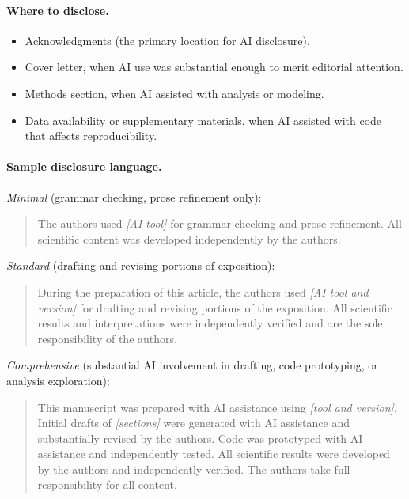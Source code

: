\documentclass{SIAMbook2023}
\begin{document}
\paragraph{Where to disclose.}
\begin{itemize}
\item Acknowledgments (the primary location for AI disclosure).
\item Cover letter, when AI use was substantial enough to merit editorial attention.
\item Methods section, when AI assisted with analysis or modeling.
\item Data availability or supplementary materials, when AI assisted with code that affects reproducibility.
\end{itemize}

\paragraph{Sample disclosure language.}

\textit{Minimal} (grammar checking, prose refinement only):

\begin{quote}
The authors used \textit{[AI tool]} for grammar checking and prose refinement. All scientific content was developed independently by the authors.
\end{quote}

\textit{Standard} (drafting and revising portions of exposition):

\begin{quote}
During the preparation of this article, the authors used \textit{[AI tool and version]} for drafting and revising portions of the exposition. All scientific results and interpretations were independently verified and are the sole responsibility of the authors.
\end{quote}

\textit{Comprehensive} (substantial AI involvement in drafting, code prototyping, or analysis exploration):

\begin{quote}
This manuscript was prepared with AI assistance using \textit{[tool and version]}. Initial drafts of \textit{[sections]} were generated with AI assistance and substantially revised by the authors. Code was prototyped with AI assistance and independently tested. All scientific results were developed by the authors and independently verified. The authors take full responsibility for all content.
\end{quote}
\end{document}

